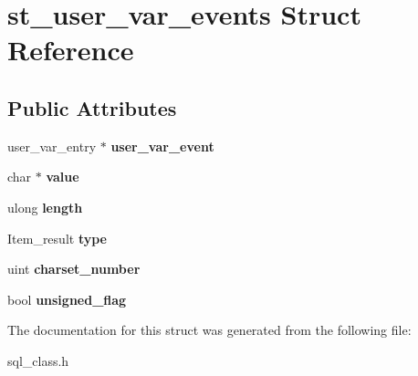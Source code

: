 \hypertarget{structst__user__var__events}{}\section{st\+\_\+user\+\_\+var\+\_\+events Struct Reference}
\label{structst__user__var__events}
\subsection*{Public Attributes}
\begin{DoxyCompactItemize}
\item 
\mbox{\label{structst__user__var__events_ad7dbf620cab348f80c53cd5d17d6eb5c}} 
user\+\_\+var\+\_\+entry $\ast$ {\bfseries user\+\_\+var\+\_\+event}
\item 
\mbox{\label{structst__user__var__events_a73e9f046133d4359bd1ceea0e0376bd0}} 
char $\ast$ {\bfseries value}
\item 
\mbox{\label{structst__user__var__events_af86802cceb882bb7886c7436d60d12b1}} 
ulong {\bfseries length}
\item 
\mbox{\label{structst__user__var__events_ae7b9379626807f1522c252e999d598f9}} 
Item\+\_\+result {\bfseries type}
\item 
\mbox{\label{structst__user__var__events_a13063201f9a0970585c081536043d6f1}} 
uint {\bfseries charset\+\_\+number}
\item 
\mbox{\label{structst__user__var__events_af56f286584c8be72c9736f609eb20519}} 
bool {\bfseries unsigned\+\_\+flag}
\end{DoxyCompactItemize}


The documentation for this struct was generated from the following file\+:\begin{DoxyCompactItemize}
\item 
sql\+\_\+class.\+h\end{DoxyCompactItemize}
